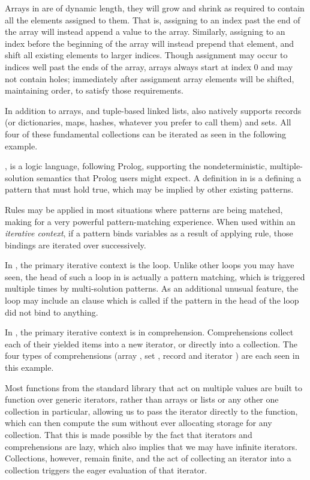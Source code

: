 Arrays in \Trilogy{} are of dynamic length, they will grow and shrink as required
to contain all the elements assigned to them. That is, assigning to an index past
the end of the array will instead append a value to the array. Similarly, assigning
to an index before the beginning of the array will instead prepend that element, and
shift all existing elements to larger indices. Though assignment may occur to indices
well past the ends of the array, arrays always start at index 0 and may not contain
holes; immediately after assignment array elements will be shifted, maintaining order,
to satisfy those requirements.

In addition to arrays, and tuple-based linked lists, \Trilogy{} also natively
supports records (or dictionaries, maps, hashes, whatever you prefer to call them)
and sets. All four of these fundamental collections can be iterated as seen in the
following example.


\Law{}, is a logic language, following Prolog, supporting the nondeterministic,
multiple-solution semantics that Prolog users might expect. A definition in \Law{}
is a  defining a pattern that must hold true, which may be implied by
other existing patterns.

Rules may be applied in most situations where patterns are being matched, making
for a very powerful pattern-matching experience. When used within an \emph{iterative
context}, if a pattern binds variables as a result of applying rule, those bindings
are iterated over successively.

In \Prose{}, the primary iterative context is the  loop. Unlike other
 loops you may have seen, the head of such a loop in \Prose{} is actually
a pattern matching, which is triggered multiple times by multi-solution patterns.
As an additional unusual feature, the  loop may include an  clause
which is called if the pattern in the head of the loop did not bind to anything.

In \Poetry{}, the primary iterative context is in comprehension. Comprehensions
collect each of their yielded items into a new iterator, or directly into a
collection. The four types of comprehensions (array \op{[]}, set \op{\{\}},
record \op{\{:\}} and iterator \op{\$()}) are each seen in this example.

Most functions from the standard library that act on multiple values are built to
function over generic iterators, rather than arrays or lists or any other one
collection in particular, allowing us to pass the iterator directly to the
 function, which can then compute the sum without ever allocating storage
for any collection. That this is made possible by the fact that iterators
and comprehensions are lazy, which also implies that we may have infinite
iterators. Collections, however, remain finite, and the act of collecting
an iterator into a collection triggers the eager evaluation of that iterator.

